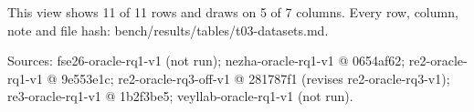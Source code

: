 \begin{table}[t]
This view shows 11 of 11 rows and draws on 5 of 7 columns. Every row, column, note and file hash: bench/\allowbreak{}results/\allowbreak{}tables/\allowbreak{}t03-datasets.md.\par
Sources: fse26-oracle-rq1-v1 (not run); nezha-oracle-rq1-v1 @ 0654af62; re2-oracle-rq1-v1 @ 9e553e1c; re2-oracle-rq3-off-v1 @ 281787f1 (revises re2-oracle-rq3-v1); re3-oracle-rq1-v1 @ 1b2f3be5; veyllab-oracle-rq1-v1 (not run).\par
\end{table}
